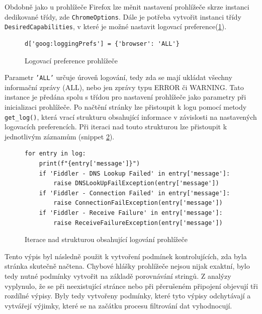 \documentclass[thesis=M,czech,hidelinks]{FITthesis}[2013/05/06]
\begin{document}
Obdobně jako u prohlížeče Firefox lze měnit nastavení prohlížeče skrze instanci dedikované třídy, zde \texttt{ChromeOptions}. Dále je potřeba vytvořit instanci třídy \texttt{DesiredCapabilities}, v které je možné nastavit logovací preference(\ref{snip:log_pref}).
\begin{figure}[h]               
	\begin{verbatim}
d['goog:loggingPrefs'] = {'browser': 'ALL'}
	\end{verbatim}      
	\caption{Logovací preference prohlížeče}
	\label{snip:log_pref}
\end{figure}
Parametr \texttt{'ALL'} určuje úroveň logování, tedy zda se mají ukládat všechny informační zprávy (ALL), nebo jen zprávy typu ERROR či WARNING.
Tato instance je předána spolu s třídou pro nastavení prohlížeče jako parametry při inicializaci prohlížeče. Po načtění stránky lze přistoupit k logu pomocí metody \texttt{get_log()}, která vrací strukturu obsahující informace v závislosti na nastavených logovacích preferencích. Při iteraci nad touto strukturou lze přistoupit k jednotlivým záznamům (snippet \ref{snip:selenium_logger}). 
\begin{figure}[h]               
	\begin{verbatim}
for entry in log:
    print(f"{entry['message']}")
    if 'Fiddler - DNS Lookup Failed' in entry['message']:
        raise DNSLookUpFailException(entry['message'])
    if 'Fiddler - Connection Failed' in entry['message']:
        raise ConnectionFailException(entry['message'])
    if 'Fiddler - Receive Failure' in entry['message']:
        raise ReceiveFailureException(entry['message'])
	\end{verbatim}      
	\caption{Iterace nad strukturou obsahující logování prohlížeče}
	\label{snip:selenium_logger}
\end{figure}

Tento výpis byl následně použit k vytvoření podmínek kontrolujících, zda byla stránka skutečně načtena. Chybové hlášky prohlížeče nejsou nijak exaktní, bylo tedy nutné podmínky vytvořit na základě porovnávání stringů. Z analýzy vyplynulo, že se při neexistující stránce nebo při přerušeném připojení objevují tři rozdílné výpisy. Byly tedy vytvořeny podmínky, které tyto výpisy odchytávají a vytvářejí výjimky, které se na začátku procesu filtrování dat vyhodnocují.
\end{document}
